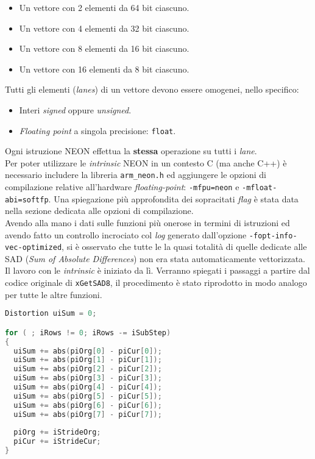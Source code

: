 \begin{itemize}
  \item Un vettore con 2 elementi da 64 bit ciascuno.
  \item Un vettore con 4 elementi da 32 bit ciascuno.
  \item Un vettore con 8 elementi da 16 bit ciascuno.
  \item Un vettore con 16 elementi da 8 bit ciascuno.
\end{itemize}

Tutti gli elementi (\emph{lanes}) di un vettore devono essere omogenei, nello 
specifico:

\begin{itemize}
  \item Interi \emph{signed} oppure \emph{unsigned}.
  \item \emph{Floating point} a singola precisione: \verb|float|.
\end{itemize}

Ogni istruzione NEON effettua la \textbf{stessa} operazione su tutti i 
\emph{lane}.\\

Per poter utilizzare le \emph{intrinsic} NEON in un contesto C (ma anche C++) è 
necessario includere la libreria \verb|arm_neon.h| ed aggiungere le opzioni di 
compilazione relative all'hardware \emph{floating-point}: \verb|-mfpu=neon| e 
\verb|-mfloat-abi=softfp|. Una spiegazione più approfondita dei sopracitati 
\emph{flag} è stata data nella sezione dedicata alle opzioni di compilazione.\\

Avendo alla mano i dati sulle funzioni più onerose in termini di istruzioni ed 
avendo fatto un controllo incrociato col \emph{log} generato dall'opzione 
\verb|-fopt-info-vec-optimized|, si è osservato che tutte le la quasi totalità 
di quelle dedicate alle SAD (\emph{Sum of Absolute Differences}) non era stata 
automaticamente vettorizzata.\\

Il lavoro con le \emph{intrinsic} è iniziato da lì. Verranno spiegati i 
passaggi a partire dal codice originale di \verb|xGetSAD8|, il procedimento è 
stato riprodotto in modo analogo per tutte le altre funzioni.\\

\begin{lstlisting}[language=C]
Distortion uiSum = 0;

for ( ; iRows != 0; iRows -= iSubStep)
{
  uiSum += abs(piOrg[0] - piCur[0]);
  uiSum += abs(piOrg[1] - piCur[1]);
  uiSum += abs(piOrg[2] - piCur[2]);
  uiSum += abs(piOrg[3] - piCur[3]);
  uiSum += abs(piOrg[4] - piCur[4]);
  uiSum += abs(piOrg[5] - piCur[5]);
  uiSum += abs(piOrg[6] - piCur[6]);
  uiSum += abs(piOrg[7] - piCur[7]);
  
  piOrg += iStrideOrg;
  piCur += iStrideCur;
}
\end{lstlisting}


